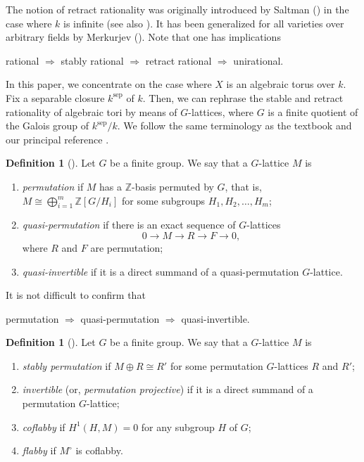 \documentclass[12pt]{amsart}
\theoremstyle{plain}
\theoremstyle{definition}
\newtheorem{dfn}[thm]{Definition}
\numberwithin{thm}{section}
\numberwithin{equation}{section}
\newcommand{\Z}{\mathbb{Z}}
\DeclareMathOperator{\sep}{sep}
\begin{document}
The notion of retract rationality was originally introduced by Saltman (\cite{Saltman1984}) in the case where $k$ is infinite (see also \cite{Kang2012}). It has been generalized for all varieties over arbitrary fields by Merkurjev (\cite{Merkurjev2017}). Note that one has implications
\begin{center}
rational $\Rightarrow$ stably rational $\Rightarrow$ 
retract rational $\Rightarrow$ unirational. 
\end{center}

In this paper, we concentrate on the case where $X$ is an algebraic torus over $k$. Fix a separable closure $k^{\sep}$ of $k$. Then, we can rephrase the stable and retract rationality of algebraic tori by means of $G$-lattices, where $G$ is a finite quotient of the Galois group of $k^{\sep}/k$. We follow the same terminology as the textbook \cite{Lorenz2005} and our principal reference \cite{Endo2011}. 

\begin{dfn}[{\cite[\S 1]{Endo2011}}]
Let $G$ be a finite group. We say that a $G$-lattice $M$ is
\begin{enumerate}
    \item \emph{permutation} if $M$ has a $\Z$-basis permuted by $G$, that is, $M\cong \bigoplus_{i=1}^{m}\Z[G/H_i]$ for some subgroups $H_1,H_2,\dots, H_m$;
    \item \emph{quasi-permutation} if there is an exact sequence of $G$-lattices
    \begin{equation*}
        0\rightarrow M \rightarrow R \rightarrow F \rightarrow 0, 
    \end{equation*}
    where $R$ and $F$ are permutation;
    \item \emph{quasi-invertible} if it is a direct summand of a quasi-permutation $G$-lattice. 
\end{enumerate}
\end{dfn}

It is not difficult to confirm that
\begin{center}
permutation $\Rightarrow$ quasi-permutation $\Rightarrow$ 
quasi-invertible. 
\end{center}

\begin{dfn}[{\cite[\S\S 2.3--2.5]{Lorenz2005}}]
Let $G$ be a finite group. We say that a $G$-lattice $M$ is
\begin{enumerate}
\item \emph{stably permutation} if $M\oplus R\cong R'$ for some permutation $G$-lattices $R$ and $R'$;
\item \emph{invertible} (or, \emph{permutation projective}) if it is a direct summand of a permutation $G$-lattice;
\item \emph{coflabby} if $H^{1}(H,M)=0$ for any subgroup $H$ of $G$;
\item \emph{flabby} if $M^{\circ}$ is coflabby. 
\end{enumerate}
\end{dfn}
\end{document}
